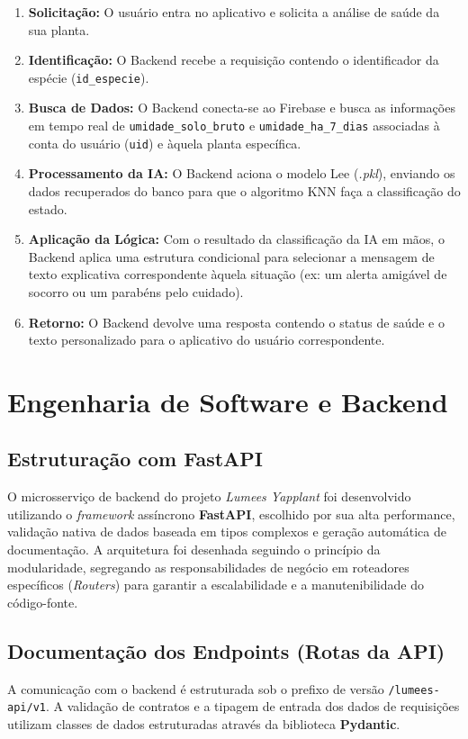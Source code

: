 \documentclass[
	12pt,
	article,
	oneside,
	a4paper,
	english,
	brazil
	]{abntex2}
\begin{document}
\begin{enumerate}
    \item \textbf{Solicitação:} O usuário entra no aplicativo e solicita a análise de saúde da sua planta.
    \item \textbf{Identificação:} O Backend recebe a requisição contendo o identificador da espécie (\texttt{id\_especie}).
    \item \textbf{Busca de Dados:} O Backend conecta-se ao Firebase e busca as informações em tempo real de \texttt{umidade\_solo\_bruto} e \texttt{umidade\_ha\_7\_dias} associadas à conta do usuário (\texttt{uid}) e àquela planta específica.
    \item \textbf{Processamento da IA:} O Backend aciona o modelo Lee (\textit{.pkl}), enviando os dados recuperados do banco para que o algoritmo KNN faça a classificação do estado.
    \item \textbf{Aplicação da Lógica:} Com o resultado da classificação da IA em mãos, o Backend aplica uma estrutura condicional para selecionar a mensagem de texto explicativa correspondente àquela situação (ex: um alerta amigável de socorro ou um parabéns pelo cuidado).
    \item \textbf{Retorno:} O Backend devolve uma resposta contendo o status de saúde e o texto personalizado para o aplicativo do usuário correspondente.
\end{enumerate}

\section{Engenharia de Software e Backend}

\subsection{Estruturação com FastAPI}
O microsserviço de backend do projeto \textit{Lumees Yapplant} foi desenvolvido utilizando o \textit{framework} assíncrono \textbf{FastAPI}, escolhido por sua alta performance, validação nativa de dados baseada em tipos complexos e geração automática de documentação. A arquitetura foi desenhada seguindo o princípio da modularidade, segregando as responsabilidades de negócio em roteadores específicos (\textit{Routers}) para garantir a escalabilidade e a manutenibilidade do código-fonte.

\subsection{Documentação dos Endpoints (Rotas da API)}
A comunicação com o backend é estruturada sob o prefixo de versão \texttt{/lumees-api/v1}. A validação de contratos e a tipagem de entrada dos dados de requisições utilizam classes de dados estruturadas através da biblioteca \textbf{Pydantic}.
\end{document}
